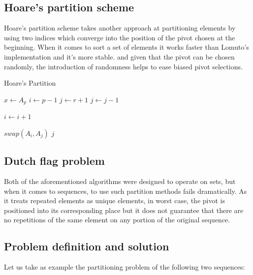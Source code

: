 \subsection{Hoare's partition scheme}

Hoare's partition scheme takes another approach at partitioning elements by using two indices which converge into the position of the pivot chosen at the beginning. When it comes to sort a set of elements it works faster than Lomuto's implementation and it's more stable. and given that the pivot can be chosen randomly, the introduction of randomness helps to ease biased pivot selections.\\

\begin{algorithm}
\caption{Hoare's Partition}\label{ALG:HOARE_PARTITION}
\begin{algorithmic}[1]
    \State $x \gets A_p$
    \State $i \gets p-1$
    \State $j \gets r+1$
        \Do 
            \State $j \gets j - 1$

        \Do 
            \State $i \gets i + 1$

            \State $swap(A_i, A_j)$
        \Else
            \State \Return $j$
        \EndIf
    \EndWhile
    \EndProcedure
\end{algorithmic}
\end{algorithm}

\subsection{Dutch flag problem}
\label{SUBSEC:DUTCH_FLAG_PROBLEM}

Both of the aforementioned algorithms were designed to operate on sets, but when it comes to sequences, to use such partition methods fails dramatically. As it treats repeated elements as unique elements, in worst case, the pivot is positioned into its corresponding place but it does not guarantee that there are no repetitions of the same element on any portion of the original sequence.\\

\subsection{Problem definition and solution}
\label{SUBSECITON:PARTITIONING_PROBLEM}

Let us take as example the partitioning problem of the following two sequences:

